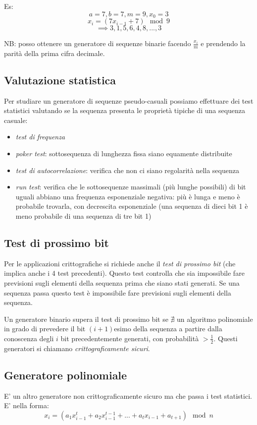 Es:
$$ a=7, b=7, m=9, x_{0}=3 $$
$$ x_i = (7x_{i-1} + 7) \mod 9 $$
$$ \implies 3, 1, 5, 6, 4, 8, ... , 3 $$

NB: posso ottenere un generatore di sequenze binarie facendo $\frac{x_i}{m}$ e prendendo la parità della prima cifra decimale.

\subsection{Valutazione statistica}
Per studiare un generatore di sequenze pseudo-casuali possiamo effettuare dei test statistici valutando se la sequenza presenta le proprietà tipiche di una sequenza casuale:
\begin{itemize}
    \item \emph{test di frequenza}
    \item \emph{poker test}: sottosequenza di lunghezza fissa siano equamente distribuite
    \item \emph{test di autocorrelazione}: verifica che non ci siano regolarità nella sequenza
    \item \emph{run test}: verifica che le sottosequenze massimali (più lunghe possibili) di bit uguali abbiano una frequenza esponenziale negativa: più è lunga e meno è probabile trovarla, con decrescita esponenziale (una sequenza di dieci bit 1 è meno probabile di una sequenza di tre bit 1)
\end{itemize}

\subsection{Test di prossimo bit}
Per le applicazioni crittografiche si richiede anche il \emph{test di prossimo bit} (che implica anche i 4 test precedenti). Questo test controlla che sia impossibile fare previsioni sugli elementi della sequenza prima che siano stati generati. Se una sequenza passa questo test è impossibile fare previsioni sugli elementi della sequenza.

Un generatore binario supera il test di prossimo bit se $ \nexists $ un algoritmo polinomiale in grado di prevedere il bit $(i+1)$esimo della sequenza a partire dalla conoscenza degli $i$ bit precedentemente generati, con probabilità $> \frac{1}{2}$. Questi generatori si chiamano \emph{crittograficamente sicuri}.

\subsection{Generatore polinomiale}
E' un altro generatore non crittograficamente sicuro ma che passa i test statistici. E' nella forma:
$$ x_{i} = \left( a_{1}x_{i-1}^{t} + a_{2}x_{i-1}^{t-1} + ... + a_{t}x_{i-1} + a_{t+1} \right) \mod n $$

